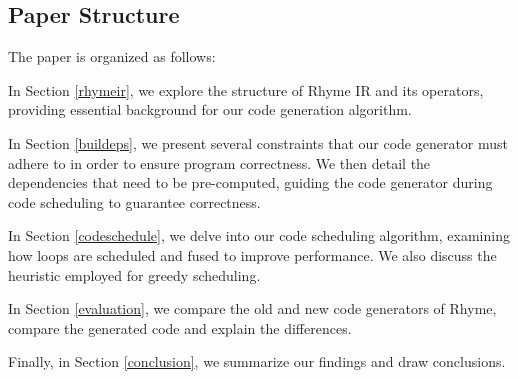 \documentclass[sigplan, nonacm]{acmart}\settopmatter{printfolios=true,printccs=false,printacmref=false}
\begin{document}
\subsection{Paper Structure}

The paper is organized as follows:\par \par
In Section \ref{rhymeir}, we explore the structure of Rhyme IR and its operators, providing essential background for our code generation algorithm.\par
In Section \ref{buildeps}, we present several constraints that our code generator must adhere to in order to ensure program correctness. We then detail the dependencies that need to be pre-computed, guiding the code generator during code scheduling to guarantee correctness.\par
In Section \ref{codeschedule}, we delve into our code scheduling algorithm, examining how loops are scheduled and fused to improve performance. We also discuss the heuristic employed for greedy scheduling.\par
In Section \ref{evaluation}, we compare the old and new code generators of Rhyme, compare the generated code and explain the differences.\par
Finally, in Section \ref{conclusion}, we summarize our findings and draw conclusions.
\end{document}
